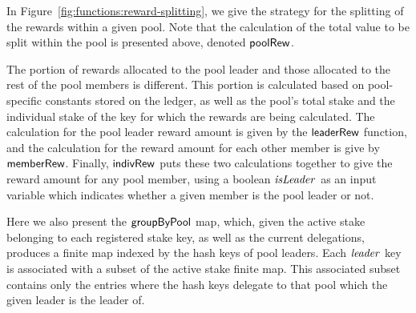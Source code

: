 In Figure~\ref{fig:functions:reward-splitting}, we give the strategy for the
splitting of the rewards within a given pool. Note that the calculation of
the total value to be split within the pool is presented above, denoted $\mathsf{poolRew}$.

The portion of rewards allocated to the pool leader and those allocated to
the rest of the pool members is different. This portion is calculated based
on pool-specific constants stored on the ledger, as well as
the pool's total stake and the individual stake of the key for which the rewards
are being calculated. The calculation for the pool
leader reward amount is given by the $\mathsf{leaderRew}$ function, and the
calculation for the reward amount for each other member is give by $\mathsf{memberRew}$.
Finally, $\mathsf{indivRew}$ puts these two calculations together to give the
reward amount for any pool member, using a boolean $\mathit{isLeader}$
as an input variable which indicates
whether a given member is the pool leader or not.

Here we also present the $\mathsf{groupByPool}$ map, which, given the active stake
belonging to each registered stake key,
as well as the current delegations, produces a
finite map indexed by the hash keys of pool leaders. Each $\mathit{leader}$ key is associated
with a subset of the active stake finite map. This associated subset
contains only the entries where the hash keys delegate to that pool
which the given leader is the leader of.

